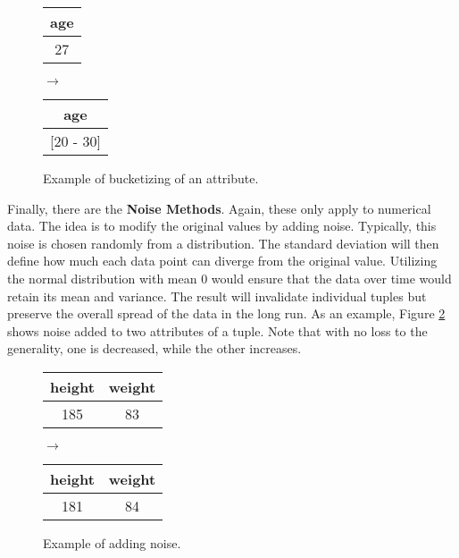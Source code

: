 \begin{figure}[ht]
    \begin{center}
    \footnotesize{
        \renewcommand{\arraystretch}{1.5}
        \begin{tabular}{|c|}
            \hline
            age \\
            \hline
            27 \\
            \hline
            \end{tabular}
            \quad $\longrightarrow$ \quad
            \begin{tabular}{|c|}
            \hline
            age \\
            \hline
            {[20 - 30]} \\
            \hline
        \end{tabular}
    }
    \end{center}
    \caption{Example of bucketizing of an attribute.\label{fig:bucketizing}}
\end{figure}

Finally, there are the \textbf{Noise Methods}. Again, these only apply to numerical data. The idea is to modify the original values by adding noise. Typically, this noise is chosen randomly from a distribution. The standard deviation will then define how much each data point can diverge from the original value. Utilizing the normal distribution with mean $0$ would ensure that the data over time would retain its mean and variance. The result will invalidate individual tuples but preserve the overall spread of the data in the long run. As an example, Figure \ref{fig:noise} shows noise added to two attributes of a tuple. Note that with no loss to the generality, one is decreased, while the other increases. 

\bigskip

\begin{figure}[ht]
    \begin{center}
    \footnotesize{
        \renewcommand{\arraystretch}{1.5}
        \begin{tabular}{|c|c|}
            \hline
            height & weight \\
            \hline
            185 & 83 \\
            \hline
            \end{tabular}
            \quad $\longrightarrow$ \quad
            \begin{tabular}{|c|c|}
            \hline
            height & weight  \\
            \hline
            181 & 84\\
            \hline
        \end{tabular}
    }
    \end{center}
    \caption{Example of adding noise.\label{fig:noise}}
\end{figure}

